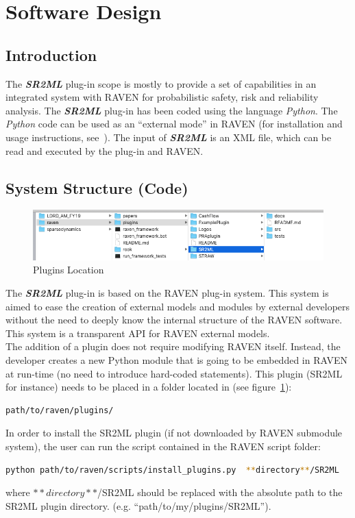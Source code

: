 \section{Software Design}
\subsection{Introduction}
The \textit{\textbf{SR2ML}} plug-in scope is mostly to provide a set of capabilities in an integrated system with RAVEN
for probabilistic safety, risk and reliability analysis.
The \textit{\textbf{SR2ML}} plug-in has been coded using the language \emph{Python}. The \emph{Python}
 code can be used as an ``external mode'' in RAVEN (for installation and usage instructions, see~\cite{RAVENuserManual}).
The input of  \textit{\textbf{SR2ML}} is an XML file, which can be read and executed by the plug-in and RAVEN.


\subsection{System Structure (Code)}
\begin{figure}
\centering
\includegraphics[width=1.0\textwidth]{pics/plugins_location.png}
\caption{Plugins Location}
\label{fig:pluginsLocation}
\end{figure}

The  \textit{\textbf{SR2ML}} plug-in is based on the RAVEN plug-in system. This system is aimed to ease the creation
of external models and modules by external developers without the need to deeply know the internal structure
of the RAVEN software. This system is a transparent API for RAVEN external models.
\\The addition of a plugin does not require modifying RAVEN itself.
Instead, the developer creates a new Python module that is going to be embedded
 in RAVEN at run-time (no need to introduce  hard-coded statements).
 This plugin (SR2ML for instance) needs to be placed in a folder  located in (see figure~\ref{fig:pluginsLocation}):
\begin{lstlisting}[language=bash]
 path/to/raven/plugins/
\end{lstlisting}
In order to install the SR2ML plugin (if not downloaded by RAVEN submodule system),
 the user can run the script contained in the RAVEN script folder:
\begin{lstlisting}[language=bash]
 python path/to/raven/scripts/install_plugins.py  **directory**/SR2ML
\end{lstlisting}
where  $**directory**$/SR2ML should be replaced with the absolute path to the SR2ML plugin directory.
(e.g. ``path/to/my/plugins/SR2ML'').

